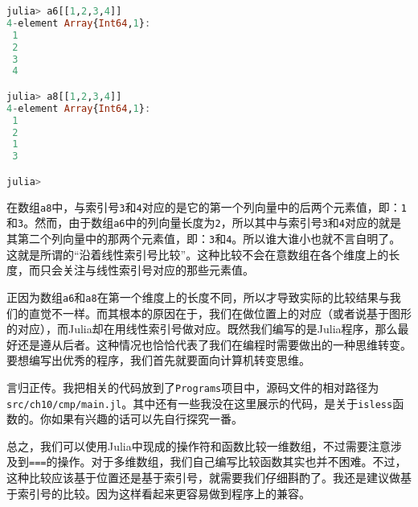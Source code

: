 \begin{lstlisting}[language=julia]
julia> a6[[1,2,3,4]]
4-element Array{Int64,1}:
 1
 2
 3
 4

julia> a8[[1,2,3,4]]
4-element Array{Int64,1}:
 1
 2
 1
 3

julia>
\end{lstlisting}

在数组\verb`a8`中，与索引号\verb`3`和\verb`4`对应的是它的第一个列向量中的后两个元素值，即：\verb`1`和\verb`3`。然而，由于数组\verb`a6`中的列向量长度为\verb`2`，所以其中与索引号\verb`3`和\verb`4`对应的就是其第二个列向量中的那两个元素值，即：\verb`3`和\verb`4`。所以谁大谁小也就不言自明了。这就是所谓的“沿着线性索引号比较”。这种比较不会在意数组在各个维度上的长度，而只会关注与线性索引号对应的那些元素值。

正因为数组\verb`a6`和\verb`a8`在第一个维度上的长度不同，所以才导致实际的比较结果与我们的直觉不一样。而其根本的原因在于，我们在做位置上的对应（或者说基于图形的对应），而Julia却在用线性索引号做对应。既然我们编写的是Julia程序，那么最好还是遵从后者。这种情况也恰恰代表了我们在编程时需要做出的一种思维转变。要想编写出优秀的程序，我们首先就要面向计算机转变思维。

言归正传。我把相关的代码放到了\verb`Programs`项目中，源码文件的相对路径为\verb`src/ch10/cmp/main.jl`。其中还有一些我没在这里展示的代码，是关于\verb`isless`函数的。你如果有兴趣的话可以先自行探究一番。

总之，我们可以使用Julia中现成的操作符和函数比较一维数组，不过需要注意涉及到\verb`===`的操作。对于多维数组，我们自己编写比较函数其实也并不困难。不过，这种比较应该基于位置还是基于索引号，就需要我们仔细斟酌了。我还是建议做基于索引号的比较。因为这样看起来更容易做到程序上的兼容。
